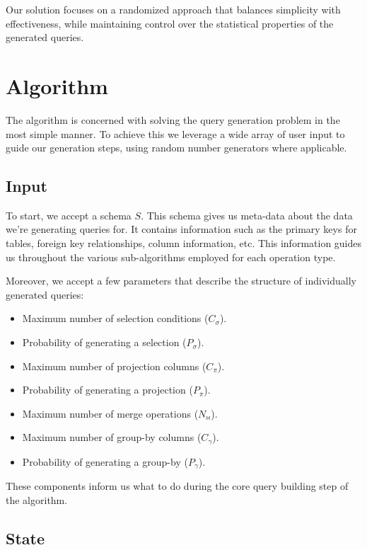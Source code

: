 \documentclass[10pt, twocolumn]{article}
\begin{document}
\noindent
Our solution focuses on a randomized approach that balances
simplicity with effectiveness, while maintaining control over
the statistical properties of the generated queries.

\section{Algorithm}

The algorithm is concerned with solving the query generation problem in the most simple manner. To achieve this we leverage a wide array of user input to guide our generation steps, using random number generators where applicable.

\subsection*{Input}

To start, we accept a schema $S$. This schema gives us meta-data about the data we're generating queries for. It contains information such as the primary keys for tables, foreign key relationships, column information, etc. This information guides us throughout the various sub-algorithms employed for each operation type.

\spacing
\noindent
Moreover, we accept a few parameters that describe the structure of individually generated queries:

\begin{itemize}
  \item Maximum number of selection conditions ($C_{\sigma}$).
  \item Probability of generating a selection ($P_{\sigma}$).
  \item Maximum number of projection columns ($C_{\pi}$).
  \item Probability of generating a projection ($P_{\pi}$).
  \item Maximum number of merge operations ($N_{\bowtie}$).
  \item Maximum number of group-by columns ($C_{\gamma}$).
  \item Probability of generating a group-by ($P_{\gamma}$).
\end{itemize}

\noindent
These components inform us what to do during the core query building step of the algorithm.

\subsection*{State}
\end{document}
